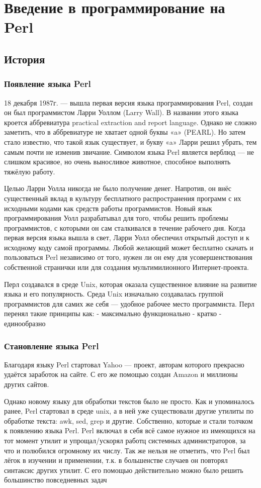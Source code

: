 \chapter{Введение в программирование на Perl}
\section{История}
\subsection{Появление языка Perl}
18 декабря 1987г. — вышла первая версия языка программирования Perl, создан он был программистом Ларри Уоллом (Larry Wall). В названии этого языка кроется аббревиатура practical extraction and report language. Однако не сложно заметить, что в аббревиатуре не хватает одной буквы «a» (PEARL). Но затем стало известно, что такой язык существует, и букву «a» Ларри решил убрать, тем самым почти не изменив звичание. Символом языка Perl является верблюд — не слишком красивое, но очень выносливое животное, способное выполнять тяжёлую работу.

Целью Ларри Уолла никогда не было получение денег. Напротив, он внёс существенный вклад в культуру бесплатного распространения программ с их исходными кодами как средств работы программистов. Новый язык программирования Уолл разрабатывал для того, чтобы решить проблемы программистов, с которыми он сам сталкивался в течение рабочего дня. Когда первая версия языка вышла в свет, Ларри Уолл обеспечил открытый доступ и к исходному коду самой программы. Любой желающий может бесплатно скачать и пользоваться Perl независимо от того, нужен ли он ему для усовершенствования собственной странички или для создания мультимилионного Интернет-проекта. 

Перл создавался в среде Unix, которая оказала существенное влияние на развитие языка и его популярность. Среда Unix изначально создавалась группой программистов для самих же себя — удобное рабочее место программиста. Перл перенял такие принципы как:
- максимально функционально
- кратко
- единообразно

\subsection{Становление языка Perl}
Благодаря языку Perl стартовал Yahoo — проект, авторам которого прекрасно удаётся заработок на сайте. С его же помощью создан Amazon и миллионы других сайтов.

Однако новому языку для обработки текстов было не просто. Как и упоминалось ранее, Perl стартовал в среде unix, а в ней уже существовали другие утилиты по обработке текста: awk, sed, grep и другие. Собственно, которые и стали толчком к появлению языка Perl. Perl включал в себя всё самое нужное из имеющихся на тот момент утилит и упрощал/ускорял работц системных администраторов, за что и полюбился огромному их числу.
Так же нельзя не отметить, что Perl был лёгок в изучении и применении, т.к. в большенстве случаев он повторял синтаксис других утилит. С его помощью действительно можно было решить большинство повседневных задач

